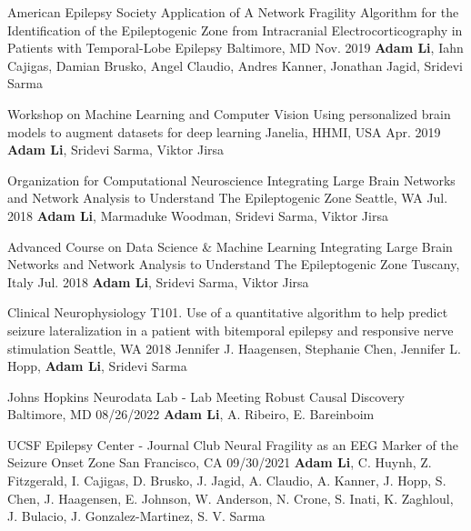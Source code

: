 \begin{cventries}
  \cvpresentation
    {American Epilepsy Society}%
    {Application of A Network Fragility Algorithm for the Identification of the Epileptogenic Zone from Intracranial Electrocorticography in Patients with Temporal-Lobe Epilepsy} %
    {Baltimore, MD} %
    {Nov. 2019} %
    {\textbf{Adam Li}, Iahn Cajigas, Damian Brusko, Angel Claudio, Andres Kanner, Jonathan Jagid, Sridevi Sarma}%
    {}
    \vspace{-0.4cm}  
    
  \cvpresentation
    {Workshop on Machine Learning and Computer Vision}%
    {Using personalized brain models to augment datasets for deep learning} %
    {Janelia, HHMI, USA} %
    {Apr. 2019} %
    {\textbf{Adam Li}, Sridevi Sarma, Viktor Jirsa}%
    {}
    \vspace{-0.4cm}  
    
  \cvpresentation
    {Organization for Computational Neuroscience}%
    {Integrating Large Brain Networks and Network Analysis to Understand The Epileptogenic Zone} %
    {Seattle, WA} %
    {Jul. 2018} %
    {\textbf{Adam Li}, Marmaduke Woodman, Sridevi Sarma, Viktor Jirsa}%
    {}
    \vspace{-0.4cm}   
  
  \cvpresentation
    {Advanced Course on Data Science \& Machine Learning}%
    {Integrating Large Brain Networks and Network Analysis to Understand The Epileptogenic Zone} %
    {Tuscany, Italy} %
    {Jul. 2018} %
    {\textbf{Adam Li}, Sridevi Sarma, Viktor Jirsa}%
    {}
    \vspace{-0.4cm}  

  \cvpresentation
    {Clinical Neurophysiology}%
    {T101. Use of a quantitative algorithm to help predict seizure lateralization in a patient with bitemporal epilepsy and responsive nerve stimulation} %
    {Seattle, WA} %
    {2018} %
    {Jennifer J. Haagensen, Stephanie Chen, Jennifer L. Hopp, \textbf{Adam Li}, Sridevi Sarma}%
    {}
    \vspace{-0.9cm}


    \cvpresentation
    {Johns Hopkins Neurodata Lab - Lab Meeting}%
    {Robust Causal Discovery} %
    {Baltimore, MD} %
    {08/26/2022} %
    {\textbf{Adam Li}, A. Ribeiro, E. Bareinboim} %
    {}

    \cvpresentation
    {UCSF Epilepsy Center - Journal Club}%
    {Neural Fragility as an EEG Marker of the Seizure Onset Zone} %
    {San Francisco, CA} %
    {09/30/2021} %
    {\textbf{Adam Li}, C. Huynh, Z. Fitzgerald, I. Cajigas, D. Brusko, J. Jagid, A. Claudio, A. Kanner, J. Hopp, S. Chen, J. Haagensen, E. Johnson, W. Anderson, N. Crone, S. Inati, K. Zaghloul, J. Bulacio, J. Gonzalez-Martinez, S. V. Sarma} %
    {}
    \vspace{-0.9cm}
    
\end{cventries}
